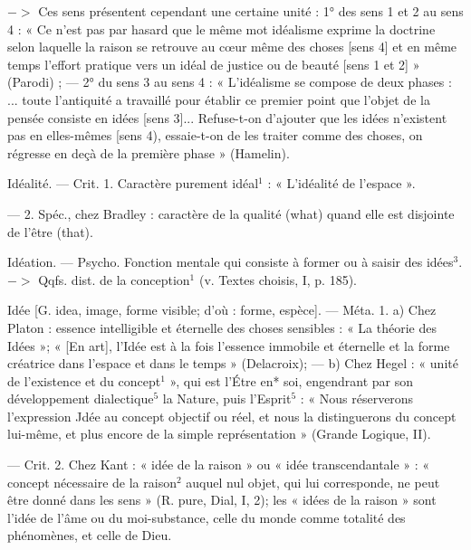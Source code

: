 $->$ Ces sens présentent cependant une certaine unité : 1° des
sens 1 et 2 au sens 4 : « Ce n’est pas
par hasard que le même mot idéalisme exprime la doctrine selon laquelle la raison se retrouve au cœur
même des choses [sens 4] et en même
temps l'effort pratique vers un idéal
de justice ou de beauté [sens 1 et 2] »
(Parodi) ; — 2° du sens 3 au sens 4 :
« L’idéalisme se compose de deux
phases : ... toute l'antiquité a travaillé pour établir ce premier point
que l’objet de la pensée consiste en
idées [sens 3]... Refuse-t-on d’ajouter que les idées n'existent pas en
elles-mêmes [sens 4), essaie-t-on
de les traiter comme des choses, on
régresse en deçà de la première
phase » (Hamelin).

Idéalité. — Crit. 1. Caractère purement idéal$^1$ : « L’idéalité de l’espace ».

— 2. Spéc., chez Bradley : caractère
de la qualité (what) quand elle est
disjointe de l'être (that).

Idéation. — Psycho. Fonction mentale
qui consiste à former ou à saisir des
idées$^3$. $->$ Qqfs. dist. de la conception$^1$ (v. Textes choisis, I, p. 185).

Idée [G. idea, image, forme visible;
d'où : forme, espèce]. — Méta. 1.
a) Chez Platon : essence intelligible
et éternelle des choses sensibles :
« La théorie des Idées »; « [En art],
l’Idée est à la fois l'essence immobile
et éternelle et la forme créatrice
dans l’espace et dans le temps » (Delacroix); — b) Chez Hegel : « unité
de l'existence et du concept$^1$ », qui
est l’Étre en* soi, engendrant par
son développement dialectique$^5$ la
Nature, puis l'Esprit$^5$ : « Nous
réserverons l'expression Jdée au
concept objectif ou réel, et nous la
distinguerons du concept lui-même,
et plus encore de la simple représentation » (Grande Logique, II).

— Crit. 2. Chez Kant : « idée de la
raison » ou « idée transcendantale » :
« concept nécessaire de la raison$^2$
auquel nul objet, qui lui corresponde, ne peut être donné dans les
sens » (R. pure, Dial, I, 2); les
« idées de la raison » sont l'idée de
l’âme ou du moi-substance, celle du
monde comme totalité des phénomènes, et celle de Dieu.

